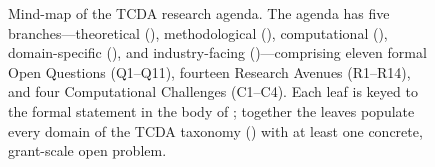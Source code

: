 \begin{figure}[t]
\begin{tikzpicture}
\end{tikzpicture}
\caption{Mind-map of the TCDA research agenda. The agenda has five
branches---theoretical (), methodological
(), computational
(), domain-specific
(), and industry-facing
()---comprising eleven formal Open
Questions (Q1--Q11), fourteen Research Avenues (R1--R14), and four
Computational Challenges (C1--C4). Each leaf is keyed to the formal
statement in the body of ; together the leaves
populate every domain of the TCDA taxonomy () with
at least one concrete, grant-scale open problem.}
\label{fig:research_mindmap}
\end{figure}
